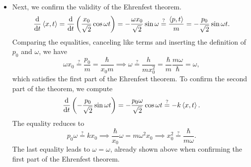 \documentclass[11pt, a4paper]{article}
\begin{document}
\begin{itemize}
	\item Next, we confirm the validity of the Ehrenfest theorem.
	\begin{equation*}
		\dv{t}\ev{x, t} = \dv{t}\left( \frac{x_{0}}{\sqrt{2}}\cos \omega t\right) = - 		\frac{\omega x_{0}}{\sqrt{2}}\sin \omega \stackrel{?}{=} \frac{\ev{p, t}}{m} = - \frac{p_{0}}{\sqrt{2}}\sin \omega t.
	\end{equation*}
	Comparing the equalities, canceling like terms and inserting the definition of $ p_{0} $ and $ \omega $, we have 
	\begin{equation*}
		 \omega x_{0} \stackrel{?}{=}\frac{p_{0}}{m} = \frac{\hbar}{x_{0}m} \implies \omega \stackrel{?}{=} \frac{h}{mx_{0}^{2}} = \frac{\hbar}{m}\frac{m \omega}{\hbar} = \omega,
	\end{equation*}
	which satisfies the first part of the Ehrenfest theorem. To confirm the second part of the theorem, we compute
	\begin{equation*}
		\dv{t}\left(-\frac{p_{0}}{\sqrt{2}}\sin \omega t\right) = -\frac{p_{0}\omega}{\sqrt{2}}\cos \omega t\stackrel{?}{=} - k \ev{x, t}.
	\end{equation*}
	The equality reduces to
	\begin{equation*}
		p_{0}\omega \stackrel{?}{=} kx_{0} \implies \frac{\hbar}{x_{0}}\omega = m \omega^{2}x_{0} \implies x_{0}^{2} \stackrel{?}{=} \frac{\hbar}{m \omega}.
	\end{equation*}
	The last equality leads to $ \omega = \omega $, already shown above when confirming the first part of the Ehrenfest theorem.
	

\end{itemize}
\end{document}
